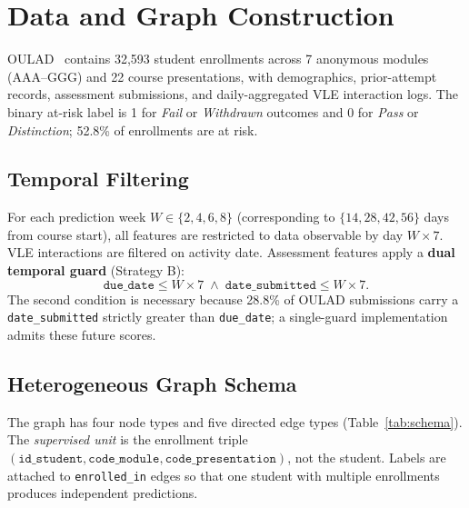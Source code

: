\documentclass[sigconf,review]{acmart}
\begin{document}
\section{Data and Graph Construction}
\label{sec:data}

OULAD~\cite{kuzilek2017oulad} contains 32,593 student enrollments across
7 anonymous modules (AAA--GGG) and 22 course presentations, with
demographics, prior-attempt records, assessment submissions, and
daily-aggregated VLE interaction logs.  The binary at-risk label is
1 for \textit{Fail} or \textit{Withdrawn} outcomes and 0 for \textit{Pass}
or \textit{Distinction}; 52.8\% of enrollments are at risk.

\subsection{Temporal Filtering}
\label{sec:temporal}

For each prediction week $W \in \{2,4,6,8\}$ (corresponding to
$\{14,28,42,56\}$ days from course start), all features are restricted to
data observable by day $W \times 7$.  VLE interactions are filtered on
activity date.  Assessment features apply a \textbf{dual temporal guard}
(Strategy B):
\begin{equation}
  \texttt{due\_date} \le W \times 7 \;\land\; \texttt{date\_submitted} \le W \times 7.
  \label{eq:dualguard}
\end{equation}
The second condition is necessary because 28.8\% of OULAD submissions carry
a \texttt{date\_submitted} strictly greater than \texttt{due\_date}; a
single-guard implementation admits these future scores.

\subsection{Heterogeneous Graph Schema}
\label{sec:schema}

The graph has four node types and five directed edge types (Table~\ref{tab:schema}).
The \emph{supervised unit} is the enrollment triple
$(\texttt{id\_student}, \texttt{code\_module}, \texttt{code\_presentation})$,
not the student.  Labels are attached to \texttt{enrolled\_in} edges so that
one student with multiple enrollments produces independent predictions.
\end{document}
